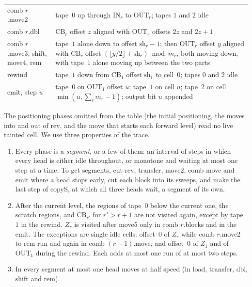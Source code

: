 \begin{center}
\begin{longtable}{>{\raggedright\arraybackslash}p{}>{\raggedright\arraybackslash}p{}}
comb $r$.move2 & tape~$0$ up through $\mathrm{IN}_r$ to $\mathrm{OUT}_r$; tapes $1$ and $2$ idle \\
comb $r$.dbl & $\mathrm{CB}_r$ offset $z$ aligned with $\mathrm{OUT}_r$ offsets $2z$ and $2z+1$ \\
comb $r$.move3, shift, move4, rem & tape~$1$ alone down to offset $\mathrm{sh}_r-1$; then $\mathrm{OUT}_r$ offset $y$ aligned with
$\mathrm{CB}_r$ offset $(\lfloor y/2\rfloor+\mathrm{sh}_r)\bmod m_r$, both moving down, with tape~$1$ alone moving up between the two parts \\
rewind & tape~$1$ down from $\mathrm{CB}_1$ offset $\mathrm{sh}_1$ to cell~$0$; tapes $0$ and $2$ idle \\
emit, step $u$ & tape~$0$ on $\mathrm{OUT}_1$ offset $u$; tape~$1$ on cell $u$; tape~$2$ on cell $\min(u,\sum_rm_r-1)$; output bit $u$
appended \\
\bottomrule
\end{longtable}
\end{center}

The positioning phases omitted from the table (the initial positioning, the moves into and out of rev, and the move that starts each
forward level) read no live tainted cell. We use three properties of the trace.
\begin{enumerate}[label=(\roman*)]
\item Every phase is a \emph{segment}, or a few of them: an interval of steps in which every head is either idle throughout, or
monotone and waiting at most one step at a time. To get segments, cut rev, transfer, move2, comb move and emit where a head stops early,
cut each block into its sweeps, and make the last step of copyS, at which all three heads wait, a segment of its own.
\item After the current level, the regions of tape~$0$ below the current one, the scratch regions, and $\mathrm{CB}_{r'}$ for
$r'>r+1$ are not visited again, except by tape~$1$ in the rewind. $Z_r$ is visited after move5 only in comb $r$.blocks and in the emit.
The exceptions are single idle cells: offset~$0$ of $Z_r$ while comb $r$.move2 to rem run and again in comb $(r-1)$.move, and offset~$0$
of $Z_1$ and of $\mathrm{OUT}_1$ during the rewind. Each adds at most one run of at most two steps.
\item In every segment at most one head moves at half speed (in load, transfer, dbl, shift and rem).
\end{enumerate}


